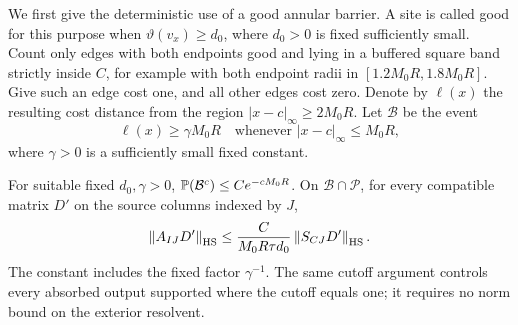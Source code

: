 We first give the deterministic use of a good annular barrier. A site
is called good for this purpose when $\vartheta(v_x)\geq d_0$, where
$d_0>0$ is fixed sufficiently small. Count only edges with both
endpoints good and lying in a buffered square band strictly inside
$C$, for example with both endpoint radii in
$[1.2M_0R,1.8M_0R]$. Give such an edge cost one, and all other edges
cost zero. Denote by $\ell(x)$ the resulting cost distance from the
region $|x-c|_\infty\geq 2M_0R$. Let $\mathcal B$ be the event
\begin{equation}\label{van:barrier-event}
 \ell(x)\geq\gamma M_0R
 \quad\text{whenever }|x-c|_\infty\leq M_0R,
\end{equation}
where $\gamma>0$ is a sufficiently small fixed constant.

\begin{lemma}\label{van:barrier}
For suitable fixed $d_0,\gamma>0$,
$\mathbb P(\mathcal B^c)\leq C e^{-cM_0R}$. On
$\mathcal B\cap\mathcal P$, for every compatible matrix $D'$ on the
source columns indexed by $J$,
\begin{equation}\label{van:barrier-bound}
 \left\lVert A_{IJ}D'\right\rVert_{\mathrm{HS}}
 \leq \frac{C}{M_0R\tau d_0}
       \left\lVert S_{CJ}D'\right\rVert_{\mathrm{HS}}.
\end{equation}
The constant includes the fixed factor $\gamma^{-1}$. The same cutoff
argument controls every absorbed output supported where the cutoff
equals one; it requires no norm bound on the exterior resolvent.
\end{lemma}

